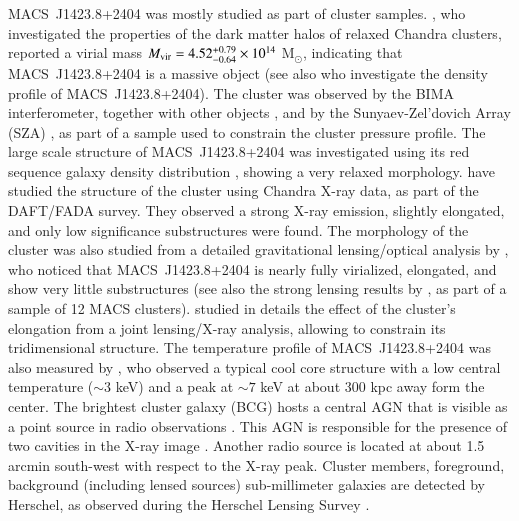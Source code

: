 \documentclass[twocolumn,traditabstract]{aa}
\begin{document}
\mbox{MACS~J1423.8+2404} was mostly studied as part of cluster samples. \cite{schmidt2007}, who investigated the properties of the dark matter halos of relaxed Chandra clusters, reported a virial mass $M_{\rm vir} = 4.52^{+0.79}_{-0.64} \times 10^{14}$ M$_{\odot}$, indicating that \mbox{MACS~J1423.8+2404} is a massive object (see also \cite{delpopolo2012} who investigate the density profile of \mbox{MACS~J1423.8+2404}). The cluster was observed by the BIMA interferometer, together with other objects \citep{laroque2003}, and by the Sunyaev-Zel'dovich Array (SZA) \cite{bonamente2012}, as part of a sample used to constrain the cluster pressure profile. The large scale structure of \mbox{MACS~J1423.8+2404} was investigated using its red sequence galaxy density distribution \cite{kartaltepe2008}, showing a very relaxed morphology. \cite{guennou2014} have studied the structure of the cluster using Chandra X-ray data, as part of the DAFT/FADA survey. They observed a strong X-ray emission, slightly elongated, and only low significance substructures were found. The morphology of the cluster was also studied from a detailed gravitational lensing/optical analysis by \cite{limousin2010}, who noticed that \mbox{MACS~J1423.8+2404} is nearly fully virialized, elongated, and show very little substructures (see also the strong lensing results by \cite{zitrin2011}, as part of a sample of 12 MACS clusters). \cite{morandi2010} studied in details the effect of the cluster's elongation from a joint lensing/X-ray analysis, allowing to constrain its tridimensional structure. The temperature profile of \mbox{MACS~J1423.8+2404} was also measured by \cite{morandi2010}, who observed a typical cool core structure with a low central temperature ($\sim 3$ keV) and a peak at $\sim 7$ keV at about 300 kpc away form the center. The brightest cluster galaxy (BCG) hosts a central AGN that is visible as a point source in radio observations \citep{condon1998,laroque2003,coble2007,bonamente2012}. This AGN is responsible for the presence of two cavities in the X-ray image \citep{hlavacek_larrondo2012}. Another radio source is located at about 1.5 arcmin south-west with respect to the X-ray peak. Cluster members, foreground, background (including lensed sources) sub-millimeter galaxies are detected by Herschel, as observed during the Herschel Lensing Survey \citep[HLS,][]{egami2010,rawle2012}.
\end{document}
